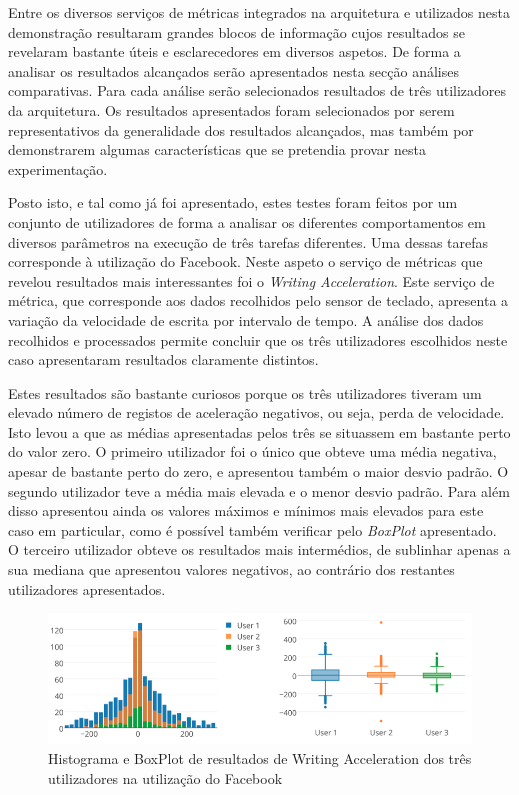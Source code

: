 Entre os diversos serviços de métricas integrados na arquitetura e utilizados nesta demonstração resultaram grandes blocos de informação cujos resultados se revelaram bastante úteis e esclarecedores em diversos aspetos. De forma a analisar os resultados alcançados serão apresentados nesta secção análises comparativas. Para cada análise serão selecionados resultados de três utilizadores da arquitetura. Os resultados apresentados foram selecionados por serem representativos da generalidade dos resultados alcançados, mas também por demonstrarem algumas características que se pretendia provar nesta experimentação.

Posto isto, e tal como já foi apresentado, estes testes foram feitos por um conjunto de utilizadores de forma a analisar os diferentes comportamentos em diversos parâmetros na execução de três tarefas diferentes. Uma dessas tarefas corresponde à utilização do Facebook. Neste aspeto o serviço de métricas que revelou resultados mais interessantes foi  o \textit{Writing Acceleration}. Este serviço de métrica, que corresponde aos dados recolhidos pelo sensor de teclado, apresenta a variação da velocidade de escrita por intervalo de tempo. A análise dos dados recolhidos e processados permite concluir que os três utilizadores escolhidos neste caso apresentaram resultados claramente distintos.


Estes resultados são bastante curiosos porque os três utilizadores tiveram um elevado número de registos de aceleração negativos, ou seja, perda de velocidade. Isto levou a que as médias apresentadas pelos três se situassem em bastante perto do valor zero. O primeiro utilizador foi o único que obteve uma média negativa, apesar de bastante perto do zero, e apresentou também o maior desvio padrão. O segundo utilizador teve a média mais elevada e o menor desvio padrão. Para além disso apresentou ainda os valores máximos e mínimos mais elevados para este caso em particular, como é possível também verificar pelo \textit{BoxPlot} apresentado. O terceiro utilizador obteve os resultados mais intermédios, de sublinhar apenas a sua mediana que apresentou valores negativos, ao contrário dos restantes utilizadores apresentados.

\begin{figure}[htb]
   \centering
   \includegraphics[scale=0.45]{Images/writingaccelerationfb.png}
   \caption{Histograma e BoxPlot de resultados de Writing Acceleration dos três utilizadores na utilização do Facebook}
\end{figure}

